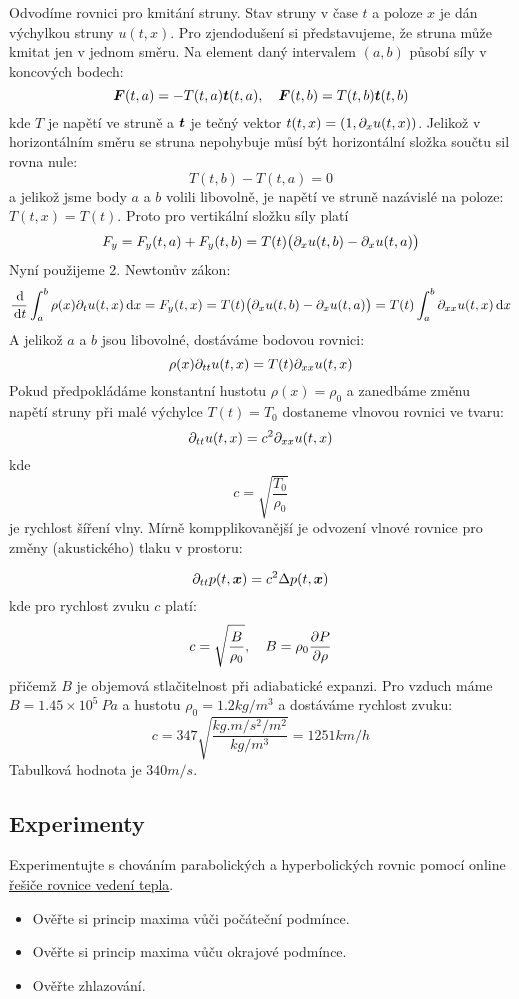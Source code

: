 Odvodíme rovnici pro kmitání struny. Stav struny v čase $t$ a poloze $x$ je dán výchylkou struny $u(t,x)$. Pro zjendodušení si představujeme, 
že struna může kmitat jen v jednom směru. Na element daný intervalem $(a,b)$ působí síly v koncových bodech:
\[
    \mathbf{\boldsymbol{F}}(t,a) = -T(t,a) \mathbf{\boldsymbol{t}}(t,a),\quad \mathbf{\boldsymbol{F}}(t,b) = T(t,b) \mathbf{\boldsymbol{t}}(t, b)
\]
kde $T$ je napětí ve struně a $\mathbf{\boldsymbol{t}}$ je tečný vektor $ t(t, x) = ( 1, \partial_x u(t,x) )$. 
Jelikož v horizontálním směru se struna nepohybuje můsí být horizontální složka součtu sil rovna nule:
\[
    T(t,b) - T(t,a) = 0
\]
a jelikož jsme body $a$ a $b$ volili libovolně,  je napětí ve struně nazávislé na poloze: $T(t, x) = T(t)$.
Proto pro vertikální složku síly platí 
\[
    F_y = F_y(t,a) + F_y(t,b) = T(t)\big(\partial_x u(t,b) - \partial_x u(t,a)\big)
\]
Nyní použijeme 2. Newtonův zákon:
\[
    \frac{\,{\rm d}}{\,{\rm d}{t}} \int_a^b \rho(x) \partial_t u(t,x) \,{\rm d} x = F_y(t,x) = T(t)\big(\partial_x u(t,b) - \partial_x u(t,a)\big) = T(t) \int_a^b \partial_{xx} u(t,x) \,{\rm d} x 
\]
A jelikož $a$ a $b$ jsou libovolné, dostáváme bodovou rovnici:
\[
    \rho(x) \partial_{tt} u(t,x) = T(t) \partial_{xx} u(t,x) 
\]
Pokud předpokládáme konstantní hustotu $\rho(x) = \rho_0$ a zanedbáme změnu napětí struny při malé výchylce $T(t)=T_0$ dostaneme vlnovou rovnici ve tvaru:
\[
    \partial_{tt} u(t,x) = c^2 \partial_{xx} u(t,x)
\]
kde 
\[
    c=\sqrt{\frac{T_0}{\rho_0}}
\]
je rychlost šíření vlny. 
Mírně kompplikovanější je odvození vlnové rovnice pro změny (akustického) tlaku v prostoru:

\[
    \partial_{tt} p(t, \mathbf{\boldsymbol{x}}) = c^2 \Delta p(t, \mathbf{\boldsymbol{x}})
\]
kde pro rychlost zvuku $c$ platí:
\[
    c = \sqrt{\frac{B}{\rho_0}},\quad B = \rho_0 \frac{\partial P}{\partial \rho}
\]
přičemž $B$ je objemová stlačitelnost při adiabatické expanzi. Pro vzduch máme $B=1.45\times 10^5\ Pa$ a hustotu $\rho_0 = 1.2kg/m^3$ a dostáváme rychlost zvuku:
\[
    c=347 \sqrt{\frac{kg.m/s^2/m^2}{kg/m^3}} = 1251 km/h
\]
Tabulková hodnota je $340m/s$.


\subsection{Experimenty}
Experimentujte s chováním parabolických a hyperbolických rovnic pomocí 
online \href{http://math.uchicago.edu/~luis/pde/heat.html}{řešiče rovnice vedení tepla}.
\begin{itemize}
 \item Ověřte si princip maxima vůči počáteční podmínce.
 \item Ověřte si princip maxima vůču okrajové podmínce.
 \item Ověřte zhlazování.
\end{itemize}

